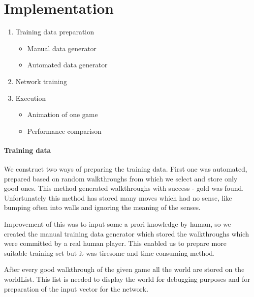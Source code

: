 \documentclass[a4paper]{article}
\begin{document}
\section{Implementation }
		\begin{enumerate}
		\item Training data preparation
			\begin{itemize}
				\item Manual data generator 
				\item Automated data generator
			\end{itemize}
		\item Network training 
		\item Execution
			\begin{itemize}
				\item Animation of one game
				\item Performance comparison 
			\end{itemize}
	\end{enumerate}
	
	\paragraph{Training data}
	We construct two ways of preparing the training data. First one was automated, prepared 
	based on random walkthroughs from which we select and store only good ones. This method
	 generated walkthroughs with success - gold was found. Unfortunately this method has stored 
	 many moves which had no sense, like bumping often into walls and ignoring the meaning 
	 of the senses.  
	 
	 Improvement of this was to input some a prori knowledge by human, so we created the manual
	 training data generator which stored the walkthroughs which were committed by a real human player.
	 This enabled us to prepare more suitable training set but it was tiresome and time consuming method.
	 
	After every good walkthrough of the given game all the world are stored on the worldList. This list is needed to display the world for debugging purposes and for preparation of the input vector for the network.
	 
	 
\end{document}
